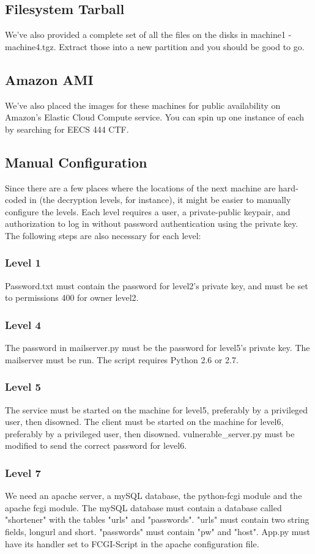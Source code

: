 \documentclass[12pt]{article}
\begin{document}
\subsection{Filesystem Tarball}
We've also provided a complete set of all the files on the disks in machine1 - machine4.tgz.  Extract those into a new partition and you should be good to go.
\subsection{Amazon AMI}
We've also placed the images for these machines for public availability on Amazon's Elastic Cloud Compute service.  You can spin up one instance of each by searching for EECS 444 CTF.
\subsection{Manual Configuration}
Since there are a few places where the locations of the next machine are hard-coded in (the decryption levels, for instance), it might be easier to manually configure the levels.  Each level requires a user, a private-public keypair, and authorization to log in without password authentication using the private key.  The following steps are also necessary for each level:
\subsubsection{Level 1}
Password.txt must contain the password for level2's private key, and must be set to permissions 400 for owner level2.
\subsubsection{Level 4}
The password in mailserver.py must be the password for level5's private key.
The mailserver must be run. The script requires Python 2.6 or 2.7.
\subsubsection{Level 5}
The service must be started on the machine for level5, preferably by a privileged user, then disowned.  The client must be started on the machine for level6, preferably by a privileged user, then disowned.  vulnerable\_server.py must be modified to send the correct password for level6.
\subsubsection{Level 7}
We need an apache server, a mySQL database, the python-fcgi module and the apache fcgi module.  The mySQL database must contain a database called "shortener" with the tables "urls" and "passwords".  "urls" must contain two string fields, longurl and short.  "passwords" must contain "pw" and "host".  App.py must have its handler set to FCGI-Script in the apache configuration file.
\end{document}
